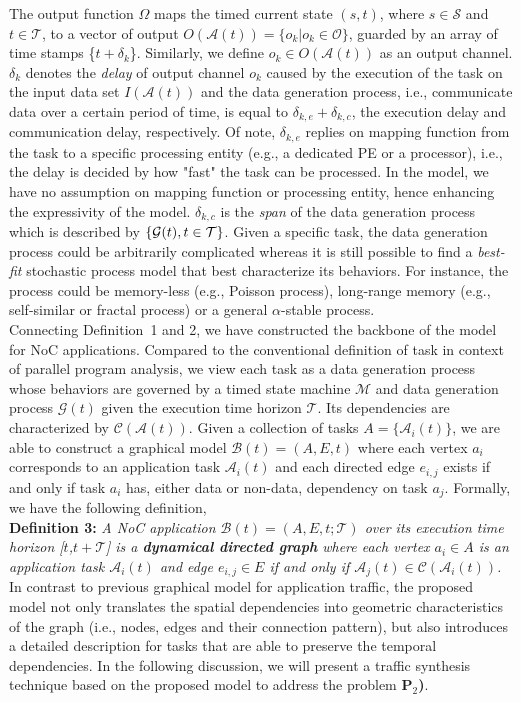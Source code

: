   \indent The output function $\Omega$ maps the timed current state $(s,t)$, where $s\in\mathcal S$ and $t \in \mathcal T$,  to a vector of output $O(\mathcal A(t))=\{o_k|o_k \in \mathcal O\}$, guarded by an array of time stamps \{$t+\delta_k$\}. Similarly, we define $o_k \in O(\mathcal A(t))$ as an output channel.  $\delta_k$ denotes the \textit{delay} of output channel $o_k$ caused by the execution of the task on the input data set $I(\mathcal A(t))$ and the data generation process, i.e., communicate data over a certain period of time, is equal to $\delta_{k,e}+\delta_{k,c}$, the execution delay and communication delay, respectively. Of note, $\delta_{k,e}$ replies on mapping function from the task to a specific processing entity (e.g., a dedicated PE or a processor), i.e., the delay is decided by how "fast" the task can be processed. In the model, we have no assumption on mapping function or processing entity, hence enhancing the expressivity of the model. $\delta_{k,c}$ is the \textit{span} of the data generation process which is described by $\mathcal \{\mathcal G(t), t\in \mathcal T\}$. Given a specific task, the data generation process could be arbitrarily complicated whereas it is still possible to find a \textit{best-fit} stochastic process model that best characterize its behaviors. For instance, the process could be memory-less (e.g., Poisson process), long-range memory (e.g., self-similar or fractal process) or a general $\alpha$-stable process.\\
  \indent Connecting Definition~1 and 2, we have constructed the backbone of the model for NoC applications. Compared to the conventional definition of task in context of parallel program analysis, we view each task as a data generation process whose behaviors are governed by a timed state machine $\mathcal M$ and data generation process $\mathcal G(t)$ given the execution time horizon $\mathcal T$. Its dependencies are characterized by $\mathcal C(\mathcal A(t))$.  Given a collection of tasks $A=\{\mathcal A_i(t)\}$, we are able to construct a graphical model $\mathcal B(t)=(A,E,t)$ where each vertex $a_i$ corresponds to an application task $\mathcal A_i(t)$ and each directed edge $e_{i,j}$ exists if and only if task $a_i$ has, either data or non-data, dependency on task $a_j$. Formally, we have the following definition,\\
\noindent \textbf{Definition 3:}\label{def:app} \textit{ A NoC application $\mathcal B(t)=(A,E,t;\mathcal T)$ over its execution time horizon [$t$,$t+\mathcal T$] is a \textbf{dynamical directed graph} where each vertex $a_{i} \in A$ is an application task $\mathcal A_i(t)$ and edge $e_{i,j} \in E$ if and only if $\mathcal A_{j}(t) \in \mathcal C(\mathcal A_{i}(t))$.}\\
\indent In contrast to previous graphical model for application traffic, the proposed model not only translates the spatial dependencies into geometric characteristics of the graph (i.e., nodes, edges and their connection pattern), but also introduces a detailed description for tasks that are able to preserve the temporal dependencies. In the following discussion, we will present a traffic synthesis technique based on the proposed model to address the problem \textbf{P$_2$)}.
